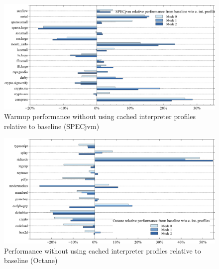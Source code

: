 \begin{figure}[ht]
  \begin{center}
    \centering
    \includegraphics[width=1.0\textwidth]{figures/all_warmup_variation_wo_i.png}
    \caption{Warmup performance without using cached interpreter profiles relative to baseline (SPECjvm)}
    \label{f:others_warmup_wo_i}
  \end{center}
\end{figure}
\begin{figure}[ht]
  \begin{center}
    \centering
    \includegraphics[width=1.0\textwidth]{figures/octane_variation_wo_i.png}
    \caption{Performance without using cached interpreter profiles relative to baseline (Octane)}
    \label{f:octane_wo_i}
  \end{center}
\end{figure}
\clearpage
